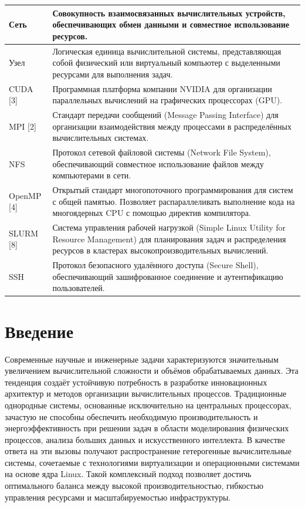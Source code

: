 \documentclass[areaset=advanced]{scrartcl}
\begin{document}
\begin{center}
\begin{longtable}{>{\raggedright\arraybackslash}p{3.5cm}>{\raggedright\arraybackslash}p{9.5cm}}
\hline
Сеть & Совокупность взаимосвязанных вычислительных устройств, обеспечивающих обмен данными и совместное использование ресурсов. \\
\hline
Узел & Логическая единица вычислительной системы, представляющая собой физический или виртуальный компьютер с выделенными ресурсами для выполнения задач. \\
\hline
CUDA [3] & Программная платформа компании NVIDIA для организации параллельных вычислений на графических процессорах (GPU). \\
\hline
MPI [2] & Стандарт передачи сообщений (Message Passing Interface) для организации взаимодействия между процессами в распределённых вычислительных системах. \\
\hline
NFS & Протокол сетевой файловой системы (Network File System), обеспечивающий совместное использование файлов между компьютерами в сети. \\
\hline
OpenMP [4] & Открытый стандарт многопоточного программирования для систем с общей памятью. Позволяет распараллеливать выполнение кода на многоядерных CPU с помощью директив компилятора. \\
\hline
SLURM [8] & Система управления рабочей нагрузкой (Simple Linux Utility for Resource Management) для планирования задач и распределения ресурсов в кластерах высокопроизводительных вычислений. \\
\hline
SSH & Протокол безопасного удалённого доступа (Secure Shell), обеспечивающий зашифрованное соединение и аутентификацию пользователей. \\
\end{longtable}
\end{center}

\newpage
\section*{Введение}
Современные научные и инженерные задачи характеризуются значительным увеличением вычислительной сложности и объёмов обрабатываемых данных. Эта тенденция создаёт устойчивую потребность в разработке инновационных архитектур и методов организации вычислительных процессов. Традиционные однородные системы, основанные исключительно на центральных процессорах, зачастую не способны обеспечить необходимую производительность и энергоэффективность при решении задач в области моделирования физических процессов, анализа больших данных и искусственного интеллекта. В качестве ответа на эти вызовы получают распространение гетерогенные вычислительные системы, сочетаемые с технологиями виртуализации и операционными системами на основе ядра Linux. Такой комплексный подход позволяет достичь оптимального баланса между высокой производительностью, гибкостью управления ресурсами и масштабируемостью инфраструктуры.
\end{document}

